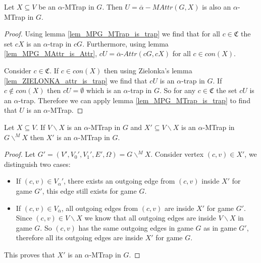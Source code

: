 \begin{lemma}
	\label{lem_MPG_attract_mptrap_is_mptrap}
	Let $X \subseteq V$ be an $\alpha$-MTrap in $G$. Then $U = \overline{\alpha}{-}MAttr(G,X)$ is also an $\alpha$-MTrap in $G$.
	\begin{proof}
		Using lemma \ref{lem_MPG_MTrap_is_trap} we find that for all $c \in \mathfrak{C}$ the set $cX$ is an $\alpha$-trap in $cG$. Furthermore, using lemma \ref{lem_MPG_MAttr_is_Attr}, $cU = \overline{\alpha}\textit{-Attr}(cG,cX)$ for all $c \in con(X)$.
		
		Consider $c \in \mathfrak{C}$. If $c \in con(X)$ then using Zielonka's lemma \ref{lem_ZIELONKA_attr_is_trap} we find that $cU$ is an $\alpha$-trap in $G$. If $c \notin con(X)$ then $cU = \emptyset$ which is an $\alpha$-trap in $G$. So for any $c \in \mathfrak{C}$ the set $cU$ is an $\alpha$-trap. Therefore we can apply lemma \ref{lem_MPG_MTrap_is_trap} to find that $U$ is an $\alpha$-MTrap.
	\end{proof}
\end{lemma}
\begin{lemma}
	\label{lem_MPG_transitive_mptrap}
	Let $X \subseteq V$. If $V\backslash X$ is an $\alpha$-MTrap in $G$ and $X' \subseteq V\backslash X$ is an $\alpha$-MTrap in $G\backslash^{\!\!M} X$ then $X'$ is an $\alpha$-MTrap in $G$.
	\begin{proof}
		Let $G' = (V',V_0', V_1', E', \Omega) = G \backslash^{\!\!M} X$.
		Consider vertex $(c,v) \in X'$, we distinguish two cases:
		\begin{itemize}
			\item If $(c,v) \in V_\alpha'$, there exists an outgoing edge from $(c,v)$ inside $X'$ for game $G'$, this edge still exists for game $G$.
			\item If $(c,v) \in V_{\overline{\alpha}}$, all outgoing edges from $(c,v)$ are inside $X'$ for game $G'$. Since $(c,v) \in V \backslash X$ we know that all outgoing edges are inside $V \backslash X$ in game $G$. So $(c,v)$ has the same outgoing edges in game $G$ as in game $G'$, therefore all its outgoing edges are inside $X'$ for game $G$.
		\end{itemize}
	This proves that $X'$ is an $\alpha$-MTrap in $G$.
	\end{proof}
\end{lemma}
